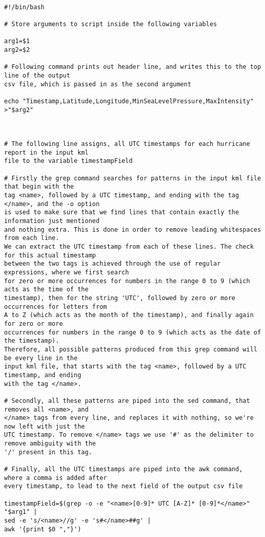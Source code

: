 \documentclass[]{article} %
\begin{document}
\begin{verbatim}

#!/bin/bash

# Store arguments to script inside the following variables

arg1=$1
arg2=$2

# Following command prints out header line, and writes this to the top line of the output 
csv file, which is passed in as the second argument

echo "Timestamp,Latitude,Longitude,MinSeaLevelPressure,MaxIntensity" >"$arg2"



# The following line assigns, all UTC timestamps for each hurricane report in the input kml 
file to the variable timestampField 

# Firstly the grep command searches for patterns in the input kml file that begin with the 
tag <name>, followed by a UTC timestamp, and ending with the tag </name>, and the -o option 
is used to make sure that we find lines that contain exactly the information just mentioned 
and nothing extra. This is done in order to remove leading whitespaces from each line. 
We can extract the UTC timestamp from each of these lines. The check for this actual timestamp 
between the two tags is achieved through the use of regular expressions, where we first search 
for zero or more occurrences for numbers in the range 0 to 9 (which acts as the time of the 
timestamp), then for the string 'UTC', followed by zero or more occurrences for letters from 
A to Z (which acts as the month of the timestamp), and finally again for zero or more 
occurrences for numbers in the range 0 to 9 (which acts as the date of the timestamp). 
Therefore, all possible patterns produced from this grep command will be every line in the 
input kml file, that starts with the tag <name>, followed by a UTC timestamp, and ending
with the tag </name>.

# Secondly, all these patterns are piped into the sed command, that removes all <name>, and 
</name> tags from every line, and replaces it with nothing, so we're now left with just the 
UTC timestamp. To remove </name> tags we use '#' as the delimiter to remove ambiguity with the 
'/' present in this tag.

# Finally, all the UTC timestamps are piped into the awk command, where a comma is added after 
every timestamp, to lead to the next field of the output csv file

timestampField=$(grep -o -e "<name>[0-9]* UTC [A-Z]* [0-9]*</name>" "$arg1" | 
sed -e 's/<name>//g' -e 's#</name>##g' |
awk '{print $0 ","}')




\end{verbatim}
\end{document}

